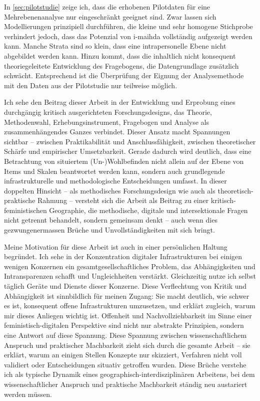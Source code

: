 In \cref{sec:pilotstudie} zeige ich, dass die erhobenen Pilotdaten für eine  Mehrebenenanalyse nur eingeschränkt geeignet sind. Zwar lassen sich Modellierungen prinzipiell durchführen, die kleine und sehr homogene Stichprobe verhindert jedoch, dass das Potenzial von \gls{i-maihda} vollständig aufgezeigt werden kann. Manche Strata sind so klein, dass eine intrapersonelle Ebene nicht abgebildet werden kann. Hinzu kommt, dass die inhaltlich nicht konsequent theoriegeleitete Entwicklung des Fragebogens, die Datengrundlage zusätzlich schwächt. Entsprechend ist die Überprüfung der Eignung der Analysemethode mit den Daten aus der Pilotstudie nur teilweise möglich.

Ich sehe den Beitrag dieser Arbeit in der Entwicklung und Erprobung eines durchgängig kritisch ausgerichteten Forschungsdesigns, das Theorie, Methodenwahl, Erhebungsinstrument, Fragebogen und Analyse als zusammenhängendes Ganzes verbindet. Dieser Ansatz macht Spannungen sichtbar -- zwischen Praktikabilität und Anschlussfähigkeit, zwischen theoretischer Schärfe und empirischer Umsetzbarkeit. Gerade dadurch wird deutlich, dass eine  Betrachtung von situiertem (Un\nobreakdash-)Wohl\-be\-find\-en nicht allein auf der Ebene von Items und Skalen beantwortet werden kann, sondern auch grundlegende infrastrukturelle und methodologische Entscheidungen umfasst. In dieser doppelten Hinsicht -- als methodisches Forschungsdesign wie auch als theoretisch-praktische Rahmung -- versteht sich die Arbeit als Beitrag zu einer kritisch-feministischen Geographie, die methodische, digitale und intersektionale Fragen nicht getrennt behandelt, sondern gemeinsam denkt -- auch wenn dies gezwungenermassen Brüche und Unvollständigkeiten mit sich bringt.

Meine Motivation für diese Arbeit ist auch in einer persönlichen Haltung begründet. Ich sehe in der Konzentration digitaler Infrastrukturen bei einigen wenigen Konzernen ein gesamtgesellschaftliches Problem, das Abhängigkeiten und Intransparenzen schafft und Ungleichheiten verstärkt. Gleichzeitig nutze ich selbst täglich Geräte und Dienste dieser Konzerne. Diese Verflechtung von Kritik und Abhängigkeit ist sinnbildlich für meinen Zugang: Sie macht deutlich, wie schwer es ist, konsequent offene Infrastrukturen umzusetzen, und erklärt zugleich, warum mir dieses Anliegen wichtig ist. Offenheit und Nachvollziehbarkeit im Sinne einer feministisch-digitalen Perspektive sind nicht nur abstrakte Prinzipien, sondern eine Antwort auf diese Spannung. Diese Spannung zwischen wissenschaftlichem Anspruch und praktischer Machbarkeit zieht sich durch die gesamte Arbeit -- sie erklärt, warum an einigen Stellen Konzepte nur skizziert, Verfahren nicht voll validiert oder Entscheidungen situativ getroffen wurden. Diese Brüche verstehe ich als typische Dynamik eines geographisch-interdisziplinären Arbeitens, bei dem wissenschaftlicher Anspruch und praktische Machbarkeit ständig neu austariert werden müssen.


